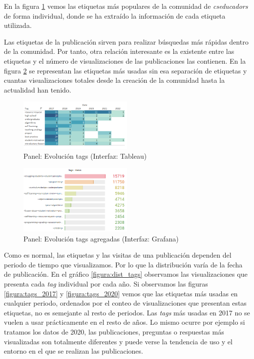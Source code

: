 \documentclass[a4paper, 12pt]{book}
\begin{document}
En la figura \ref{figura:evo_tags_anual} vemos las etiquetas más populares de la comunidad de \emph{cseducadors} de forma individual, donde se ha extraído la información de cada etiqueta utilizada. 

Las etiquetas de la publicación sirven para realizar búsquedas más rápidas dentro de la comunidad. Por tanto, otra relación interesante es la existente entre las etiquetas y el número de visualizaciones de las publicaciones las contienen. En la figura \ref{figura:evo_tags} se representan las etiquetas más usadas sin esa separación de etiquetas y cuantas visualizaciones totales desde la creación de la comunidad hasta la actualidad han tenido. 

\begin{figure}[ht]
    \centering
    \includegraphics[width=0.5\textwidth]{img/cse/tags_evo.png}
    \caption{Panel: Evolución tags (Interfaz: Tableau)}
    \label{figura:evo_tags_anual}
\end{figure}

\begin{figure}[ht]
    \centering
    \includegraphics[width=0.5\textwidth]{img/cse/evo_tags.png}
    \caption{Panel: Evolución tags agregadas (Interfaz: Grafana)}
    \label{figura:evo_tags}
\end{figure}


Como es normal, las etiquetas y las visitas de una publicación dependen del periodo de tiempo que visualizamos. Por lo que la distribución varía de la fecha de publicación. En el gráfico \ref{figura:dist_tags} observamos las visualizaciones que presenta cada \emph{tag} individual por cada año. Si observamos las figuras \ref{figura:tags_2017} y \ref{figura:tags_2020} vemos que las etiquetas más usadas en cualquier periodo, ordenados por el conteo de visualizaciones que presentan estas etiquetas, no es semejante al resto de periodos. Las \emph{tags} más usadas en 2017 no se vuelen a usar prácticamente en el resto de años. Lo mismo ocurre por ejemplo si tratamos los datos de 2020, las publicaciones, preguntas o respuestas más visualizadas son totalmente diferentes y puede verse la tendencia de uso y el entorno en el que se realizan las publicaciones. 
\end{document}
